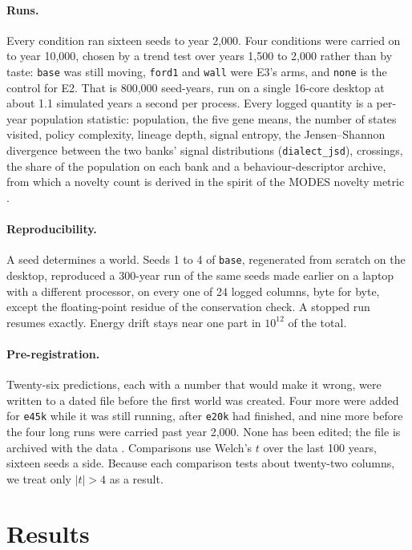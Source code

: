 \documentclass[letterpaper]{article}
\newcommand{\cond}[1]{\texttt{#1}}
\begin{document}
\paragraph{Runs.} Every condition ran sixteen seeds to year 2,000. Four conditions were carried on to
year 10,000, chosen by a trend test over years 1,500 to 2,000 rather than by taste: \cond{base} was
still moving, \cond{ford1} and \cond{wall} were E3's arms, and \cond{none} is the control for E2. That
is 800,000 seed-years, run on a single 16-core desktop at about 1.1 simulated years a second per
process. Every logged quantity is a per-year population statistic: population, the five gene means,
the number of states visited, policy complexity, lineage depth, signal entropy, the Jensen--Shannon
divergence between the two banks' signal distributions (\cond{dialect\_jsd}), crossings, the share of
the population on each bank and a behaviour-descriptor archive, from which a novelty count is derived in the spirit of the MODES
novelty metric \citep{dolson2019}.

\paragraph{Reproducibility.} A seed determines a world. Seeds 1 to 4 of \cond{base}, regenerated from
scratch on the desktop, reproduced a 300-year run of the same seeds made earlier on a laptop with a
different processor, on every one of 24 logged columns, byte for byte, except the floating-point
residue of the conservation check. A stopped run resumes exactly.
Energy drift stays near one part in $10^{12}$ of the total.

\paragraph{Pre-registration.} Twenty-six predictions, each with a number that would make it wrong,
were written to a dated file before the first world was created. Four more were added for \cond{e45k}
while it was still running, after \cond{e20k} had finished, and nine more before the four long runs
were carried past year 2,000. None has been edited; the file is archived with the data
\citep{bremner2026data}. Comparisons use Welch's $t$ over the last 100 years, sixteen seeds a side.
Because each comparison tests about twenty-two columns, we treat only $|t| > 4$ as a result.

\section{Results}
\end{document}
